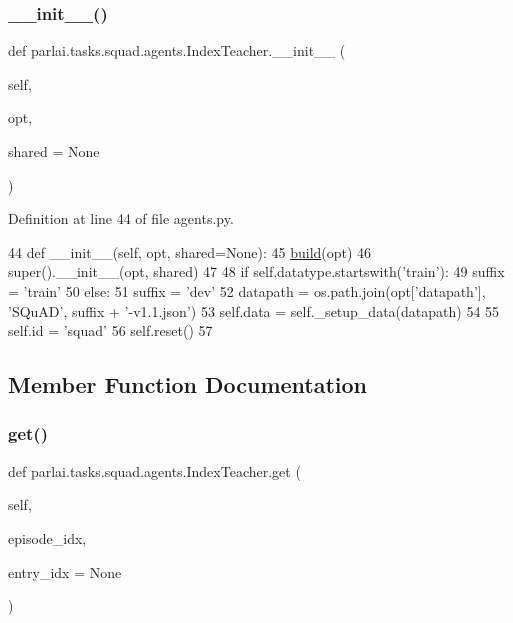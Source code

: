 \subsubsection{\texorpdfstring{\+\_\+\+\_\+init\+\_\+\+\_\+()}{\_\_init\_\_()}}
{\footnotesize\ttfamily def parlai.\+tasks.\+squad.\+agents.\+Index\+Teacher.\+\_\+\+\_\+init\+\_\+\+\_\+ (\begin{DoxyParamCaption}\item[{}]{self,  }\item[{}]{opt,  }\item[{}]{shared = {\ttfamily None} }\end{DoxyParamCaption})}



Definition at line 44 of file agents.\+py.


\begin{DoxyCode}
44     \textcolor{keyword}{def }\_\_init\_\_(self, opt, shared=None):
45         \hyperlink{namespaceparlai_1_1mturk_1_1tasks_1_1talkthewalk_1_1download_a8c0fbb9b6dfe127cb8c1bd6e7c4e33fd}{build}(opt)
46         super().\_\_init\_\_(opt, shared)
47 
48         \textcolor{keywordflow}{if} self.datatype.startswith(\textcolor{stringliteral}{'train'}):
49             suffix = \textcolor{stringliteral}{'train'}
50         \textcolor{keywordflow}{else}:
51             suffix = \textcolor{stringliteral}{'dev'}
52         datapath = os.path.join(opt[\textcolor{stringliteral}{'datapath'}], \textcolor{stringliteral}{'SQuAD'}, suffix + \textcolor{stringliteral}{'-v1.1.json'})
53         self.data = self.\_setup\_data(datapath)
54 
55         self.id = \textcolor{stringliteral}{'squad'}
56         self.reset()
57 
\end{DoxyCode}


\subsection{Member Function Documentation}
\mbox{\label{classparlai_1_1tasks_1_1squad_1_1agents_1_1IndexTeacher_a44b2ee4a74283e8fe0a5b92749ed93d8}} 
\subsubsection{\texorpdfstring{get()}{get()}}
{\footnotesize\ttfamily def parlai.\+tasks.\+squad.\+agents.\+Index\+Teacher.\+get (\begin{DoxyParamCaption}\item[{}]{self,  }\item[{}]{episode\+\_\+idx,  }\item[{}]{entry\+\_\+idx = {\ttfamily None} }\end{DoxyParamCaption})}



